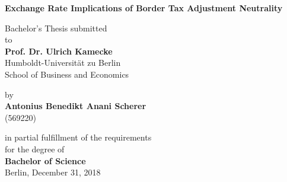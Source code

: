 \begin{center}

    {\Large{\bf Exchange Rate Implications of Border Tax Adjustment Neutrality}} \vspace{0.5cm}


    {\normalsize Bachelor's Thesis submitted\\\vspace{0.5cm}
    to}\\\vspace{0.5cm}
    {\normalsize{\bf Prof. Dr. Ulrich Kamecke}} \\\vspace{0.5cm}
    {\normalsize Humboldt-Universit\"at zu Berlin \\
    School of Business and Economics \\} \vspace{1cm}


    {\normalsize by \\\vspace{0.5cm}
    {\bf Antonius Benedikt Anani Scherer} \\
    (569220)} \vspace{1cm}


    {\normalsize in partial fulfillment of the requirements \\
    for the degree of \\
    {\bf Bachelor of Science} \\
    Berlin, December 31, 2018}

\end{center}
